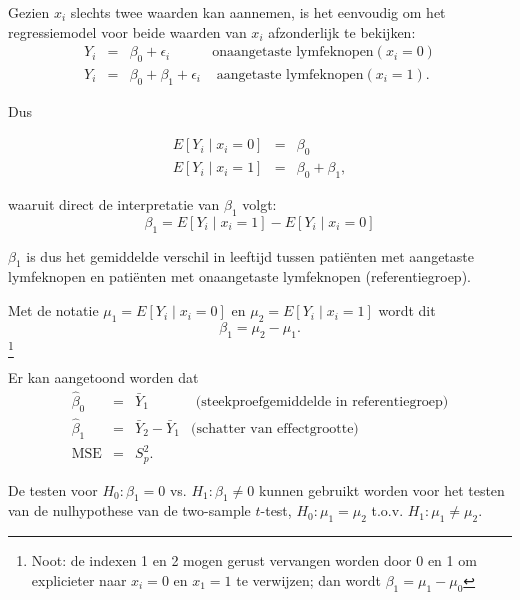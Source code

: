 \documentclass[12pt,dutch,coursenotes]{book}
\newenvironment{Shaded}{\begin{snugshade}}{\end{snugshade}}
\newcommand{\KeywordTok}[1]{\textcolor[rgb]{0.13,0.29,0.53}{\textbf{#1}}}
\newcommand{\DataTypeTok}[1]{\textcolor[rgb]{0.13,0.29,0.53}{#1}}
\newcommand{\StringTok}[1]{\textcolor[rgb]{0.31,0.60,0.02}{#1}}
\newcommand{\OtherTok}[1]{\textcolor[rgb]{0.56,0.35,0.01}{#1}}
\newcommand{\OperatorTok}[1]{\textcolor[rgb]{0.81,0.36,0.00}{\textbf{#1}}}
\newcommand{\NormalTok}[1]{#1}
\let\rmarkdownfootnote\footnote%
\def\footnote{\protect\rmarkdownfootnote}
\theoremstyle{definition}
\theoremstyle{definition}
\theoremstyle{definition}
\theoremstyle{remark}
\begin{document}
Gezien \(x_i\) slechts twee waarden kan aannemen, is het eenvoudig om
het regressiemodel voor beide waarden van \(x_i\) afzonderlijk te
bekijken: \[ \begin{array}{lcll}
   Y_i &=& \beta_0 +\epsilon_i &\text{onaangetaste lymfeknopen} (x_i=0) \\
   Y_i &=& \beta_0 + \beta_1 +\epsilon_i &\text{ aangetaste lymfeknopen} (x_i=1) .
 \end{array}\]

Dus

\begin{eqnarray*}
   E\left[Y_i\mid x_i=0\right] &=& \beta_0 \\
   E\left[Y_i\mid x_i=1\right] &=& \beta_0 + \beta_1,
\end{eqnarray*}

waaruit direct de interpretatie van \(\beta_1\) volgt:
\[   \beta_1 = E\left[Y_i\mid x_i=1\right]-E\left[Y_i\mid x_i=0\right]\]

\(\beta_1\) is dus het gemiddelde verschil in leeftijd tussen patiënten
met aangetaste lymfeknopen en patiënten met onaangetaste lymfeknopen
(referentiegroep).

Met de notatie \(\mu_1= E\left[Y_i\mid x_i=0\right]\) en
\(\mu_2= E\left[Y_i\mid x_i=1\right]\) wordt dit
\[\beta_1 = \mu_2-\mu_1.\]\footnote{Noot: de indexen 1 en 2 mogen gerust
  vervangen worden door 0 en 1 om explicieter naar \(x_i=0\) en
  \(x_1=1\) te verwijzen; dan wordt \(\beta_1=\mu_1-\mu_0\)}

Er kan aangetoond worden dat \[\begin{array}{ccll}
 \hat\beta_0 
   &=& \bar{Y}_1&\text{ (steekproefgemiddelde in referentiegroep)} \\
 \hat\beta_1 
   &=& \bar{Y}_2-\bar{Y}_1&\text{(schatter van effectgrootte)} \\
 \text{MSE}
   &=& S_p^2 .
\end{array}\]

De testen voor \(H_0:\beta_1=0\) vs. \(H_1:\beta_1\neq0\) kunnen
gebruikt worden voor het testen van de nulhypothese van de two-sample
\(t\)-test, \(H_0:\mu_1=\mu_2\) t.o.v. \(H_1:\mu_1\neq\mu_2\).

\begin{Shaded}
\end{Shaded}
\end{document}
